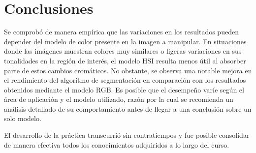 \section{Conclusiones}

Se comprobó de manera empírica que las variaciones en los resultados pueden depender del modelo de color presente en la imagen a manipular. En situaciones donde las imágenes muestran colores muy similares o ligeras variaciones en sus tonalidades en la región de interés, el modelo HSI resulta menos útil al absorber parte de estos cambios cromáticos. No obstante, se observa una notable mejora en el rendimiento del algoritmo de segmentación en comparación con los resultados obtenidos mediante el modelo RGB. Es posible que el desempeño varíe según el área de aplicación y el modelo utilizado, razón por la cual se recomienda un análisis detallado de su comportamiento antes de llegar a una conclusión sobre un solo modelo.

El desarrollo de la práctica transcurrió sin contratiempos y fue posible consolidar de manera efectiva todos los conocimientos adquiridos a lo largo del curso. 